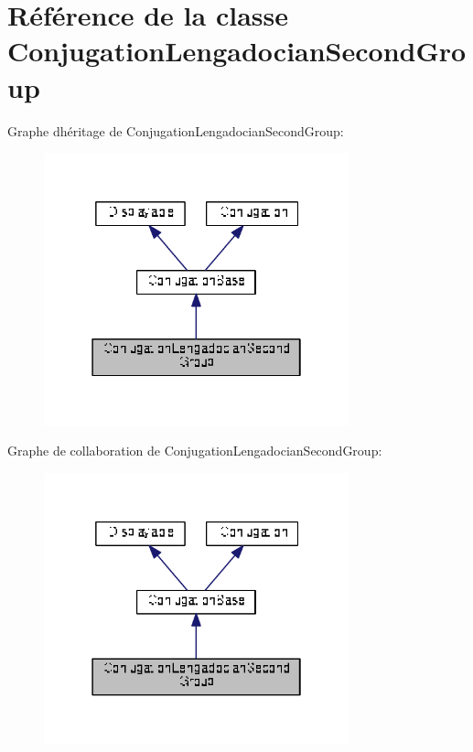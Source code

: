 \hypertarget{class_conjugation_lengadocian_second_group}{}\section{Référence de la classe Conjugation\+Lengadocian\+Second\+Group}
\label{class_conjugation_lengadocian_second_group}


Graphe d\textquotesingle{}héritage de Conjugation\+Lengadocian\+Second\+Group\+:
\nopagebreak
\begin{figure}[H]
\begin{center}
\leavevmode
\includegraphics[width=250pt]{class_conjugation_lengadocian_second_group__inherit__graph}
\end{center}
\end{figure}


Graphe de collaboration de Conjugation\+Lengadocian\+Second\+Group\+:
\nopagebreak
\begin{figure}[H]
\begin{center}
\leavevmode
\includegraphics[width=250pt]{class_conjugation_lengadocian_second_group__coll__graph}
\end{center}
\end{figure}
